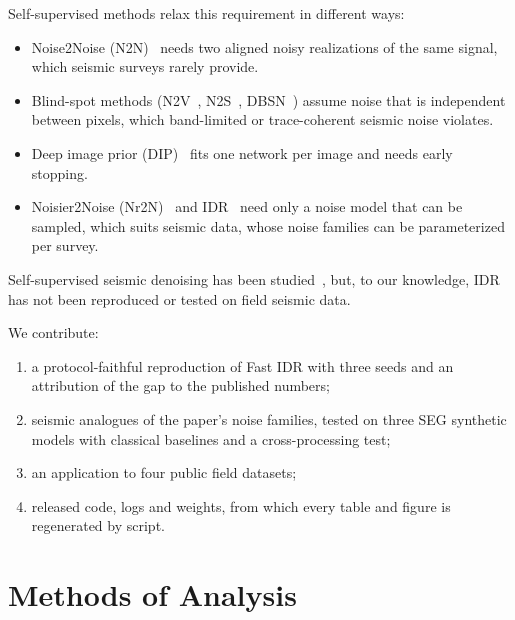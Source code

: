 \documentclass[journal]{IEEEtran}
\begin{document}
Self-supervised methods relax this requirement in different ways:
\begin{itemize}
\item Noise2Noise (N2N)~\cite{lehtinen2018n2n} needs two aligned noisy realizations of the same signal, which seismic surveys rarely provide.
\item Blind-spot methods (N2V~\cite{krull2019n2v}, N2S~\cite{batson2019n2s}, DBSN~\cite{wu2020dbsn}) assume noise that is independent between pixels, which band-limited or trace-coherent seismic noise violates.
\item Deep image prior (DIP)~\cite{ulyanov2018dip} fits one network per image and needs early stopping.
\item Noisier2Noise (Nr2N)~\cite{moran2020nr2n} and IDR~\cite{zhang2022idr} need only a noise model that can be sampled, which suits seismic data, whose noise families can be parameterized per survey.
\end{itemize}
Self-supervised seismic denoising has been studied~\cite{birnie2021ssl}, but, to our knowledge, IDR has not been reproduced or tested on field seismic data.

We contribute:
\begin{enumerate}
\item a protocol-faithful reproduction of Fast IDR with three seeds and an attribution of the gap to the published numbers;
\item seismic analogues of the paper's noise families, tested on three SEG synthetic models with classical baselines and a cross-processing test;
\item an application to four public field datasets;
\item released code, logs and weights, from which every table and figure is regenerated by script.
\end{enumerate}

\section{Methods of Analysis}\label{sec:methods}
\end{document}
